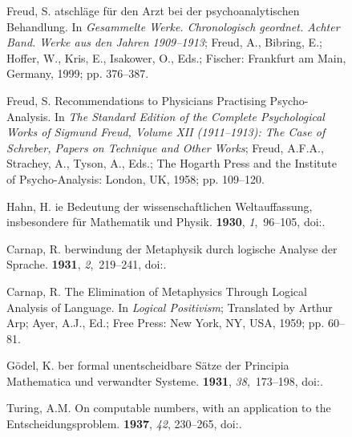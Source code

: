 \documentclass[entropy,article,accept,oneauthor,pdftex]{Definitions/mdpi}
\begin{document}
\begin{figure}[H]
\begin{thebibliography}{999}
Freud, S.
atschl{\"{a}}ge f{\"{u}}r den {A}rzt bei der psychoanalytischen
  {B}ehandlung. In {\em {G}esammelte {W}erke. {C}hronologisch geordnet.
  {A}chter {B}and. {W}erke aus den {J}ahren 1909--1913}; Freud, A., Bibring,
  E.; Hoffer, W., Kris, E., Isakower, O., Eds.; Fischer: Frankfurt am Main, Germany, 1999; pp. 376--387.%

Freud, S.
\newblock Recommendations to Physicians Practising Psycho-Analysis. In {\em The
  Standard Edition of the Complete Psychological Works of Sigmund Freud, Volume
  XII (1911--1913): The Case of {S}chreber, Papers on Technique and Other
  Works}; Freud, A.F.A., Strachey, A., Tyson, A., Eds.; The Hogarth Press and
  the Institute of Psycho-Analysis: London, UK, 1958; pp. 109--120.%

Hahn, H.
ie {B}edeutung der wissenschaftlichen {W}eltauffassung,
  insbesondere f{\"u}r {M}athematik und {P}hysik.
 {\bf 1930}, {\em 1},~96--105, doi:{\href{https://doi.org/10.1007/BF00208612}{}}.

Carnap, R.
berwindung der {M}etaphysik durch logische {A}nalyse der
  {S}prache.
 {\bf 1931}, {\em 2},~219--241, doi:{\href{https://doi.org/10.1007/BF02028153}{}}.

Carnap, R.
\newblock The Elimination of Metaphysics Through Logical Analysis of Language.
  In {\em Logical Positivism}; Translated by Arthur Arp; Ayer, A.J., Ed.; Free Press: New York, NY, USA, 1959;
  pp. 60--81.

G{\"{o}}del, K.
ber formal unentscheidbare {S}\"{a}tze der {P}rincipia
  {M}athematica und verwandter {S}ysteme.
 {\bf 1931}, {\em 38},~173--198, doi:{\href{https://doi.org/10.1007/s00605-006-0423-7}{}}.

{T}uring, A.M.
\newblock On computable numbers, with an application to the {E}ntscheidungsproblem.
 \textbf{1937}, \emph{42},  230--265, doi:{\href{https://doi.org/10.1112/plms/s2-42.1.230}{}}.


\end{thebibliography}
\end{figure}
\end{document}
